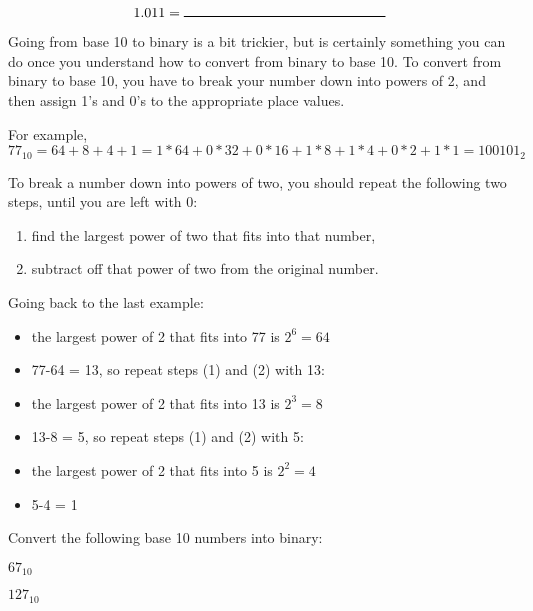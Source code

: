 \documentclass{article}
\begin{document}
\vspace{0.2in} 

\[1.011 = \rule{2in}{.01in}\]

\newpage

Going from base 10 to binary is a bit trickier, but is certainly something you can do once you understand how to convert from binary to base 10. To convert from binary to base 10, you have to break your number down into powers of 2, and then assign 1's and 0's to the appropriate place values. 

For example, 
\[77_{10} = 64 + 8 + 4 + 1 = 1*64 + 0*32 + 0*16 + 1*8 + 1*4 + 0*2 + 1*1 = 100101_2 \]

\vspace{0.2in}

To break a number down into powers of two, you should repeat the following two steps, until you are left with 0:\newline
\begin{enumerate}
\item  find the largest power of two that fits into that number,
\item subtract off that power of two from the original number.
\end{enumerate}

\vspace{0.2in}

Going back to the last example:
\begin{itemize}
\item[] the largest power of 2 that fits into 77 is $2^6=64$
\item[] 77-64 = 13, so repeat steps (1) and (2) with 13:
\item[] the largest power of 2 that fits into 13 is $2^3=8$
\item[] 13-8 = 5, so repeat steps (1) and (2) with 5:
\item[] the largest power of 2 that fits into 5 is $2^2=4$
\item[]  5-4 = 1
\end{itemize}

\vspace{0.3in}

Convert the following base 10 numbers into binary:

\vspace{0.3in}

$67_{10}$

\vfill

$127_{10}$

\vfill
\end{document}
